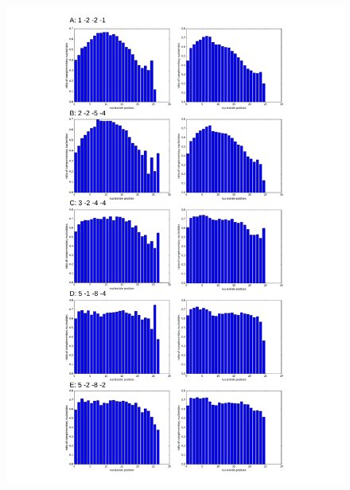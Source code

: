 \documentclass[12pt]{article}
\begin{document}
\begin{figure}
\includegraphics[scale=0.65]{results/combined_results.pdf}

\end{figure}
\end{document}
